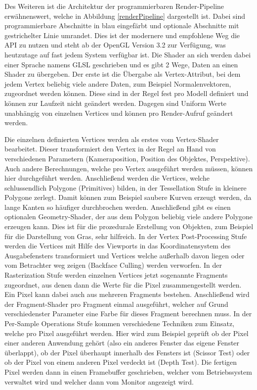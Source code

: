 Des Weiteren ist die Architektur der programmierbaren Render-Pipeline erwähnenswert, welche in Abbildung \ref{renderPipeline} dargestellt ist. Dabei sind programmierbare Abschnitte in blau eingefärbt und optionale Abschnitte mit gestrichelter Linie umrandet. Dies ist der modernere und empfohlene Weg die API zu nutzen und steht ab der OpenGL Version 3.2 zur Verfügung, was heutzutage auf fast jedem System verfügbar ist. Die Shader an sich werden dabei einer Sprache namens GLSL geschrieben und es gibt 2 Wege, Daten an einen Shader zu übergeben. Der erste ist die Übergabe als Vertex-Attribut, bei dem jedem Vertex beliebig viele andere Daten, zum Beispiel Normalenvektoren, zugeordnet werden können. Diese sind in der Regel fest pro Modell definiert und können zur Laufzeit nicht geändert werden. Dagegen sind Uniform Werte unabhängig von einzelnen Vertices und können pro Render-Aufruf geändert werden.

Die einzelnen definierten Vertices werden als erstes vom Vertex-Shader bearbeitet. Dieser transformiert den Vertex in der Regel an Hand von verschiedenen Parametern (Kameraposition, Position des Objektes, Perspektive). Auch andere Berechnungen, welche pro Vertex ausgeführt werden müssen, können hier durchgeführt werden. Anschließend werden die Vertices, welche schlussendlich Polygone (Primitives) bilden, in der Tessellation Stufe in kleinere Polygone zerlegt. Damit können zum Beispiel saubere Kurven erzeugt werden, da lange Kanten so häufiger durchbrochen werden. Anschließend gibt es einen optionalen Geometry-Shader, der aus dem Polygon beliebig viele andere Polygone erzeugen kann. Dies ist für die prozedurale Erstellung von Objekten, zum Beispiel für die Darstellung von Gras, sehr hilfreich. In der Vertex Post-Processing Stufe werden die Vertices mit Hilfe des Viewports in das Koordinatensystem des Ausgabefensters transformiert und Vertices welche außerhalb davon liegen oder vom Betrachter weg zeigen (Backface Culling) werden verworfen. In der Rasterization Stufe werden einzelnen Vertices jetzt sogenannte Fragments zugeordnet, aus denen dann die Werte für die Pixel zusammengestellt werden. Ein Pixel kann dabei auch aus mehreren Fragments bestehen. Anschließend wird der Fragment-Shader pro Fragment einmal ausgeführt, welcher auf Grund verschiedenster Parameter eine Farbe für dieses Fragment berechnen muss. In der Per-Sample Operations Stufe kommen verschiedene Techniken zum Einsatz, welche pro Pixel ausgeführt werden. Hier wird zum Beispiel geprüft ob der Pixel einer anderen Anwendung gehört (also ein anderes Fenster das eigene Fenster überlappt), ob der Pixel überhaupt innerhalb des Fensters ist (Scissor Test) oder ob der Pixel von einem anderen Pixel verdeckt ist (Depth Test). Die fertigen Pixel werden dann in einen Framebuffer geschrieben, welcher vom Betriebssystem verwaltet wird und welcher dann vom Monitor angezeigt wird.

